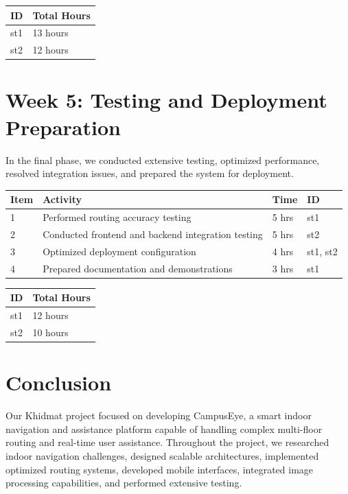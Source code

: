\documentclass{article}
\begin{document}
\bigskip

\begin{tabular}{|l|l|}
  \hline
  ID & Total Hours \\\hline\hline
  st1 & 13 hours \\\hline
  st2 & 12 hours \\\hline
\end{tabular}

\newpage
\section*{Week 5: Testing and Deployment Preparation}

In the final phase, we conducted extensive testing, optimized performance, resolved integration issues, and prepared the system for deployment.

\begin{tabular}{|l|l|l|l|}
  \hline
  Item & Activity & Time & ID \\\hline\hline
  1 & Performed routing accuracy testing & 5 hrs & st1 \\\hline
  2 & Conducted frontend and backend integration testing & 5 hrs & st2 \\\hline
  3 & Optimized deployment configuration & 4 hrs & st1, st2 \\\hline
  4 & Prepared documentation and demonstrations & 3 hrs & st1 \\\hline
\end{tabular}

\bigskip

\begin{tabular}{|l|l|}
  \hline
  ID & Total Hours \\\hline\hline
  st1 & 12 hours \\\hline
  st2 & 10 hours \\\hline
\end{tabular}

\newpage
\section*{Conclusion}

Our Khidmat project focused on developing CampusEye, a smart indoor navigation and assistance platform capable of handling complex multi-floor routing and real-time user assistance. Throughout the project, we researched indoor navigation challenges, designed scalable architectures, implemented optimized routing systems, developed mobile interfaces, integrated image processing capabilities, and performed extensive testing.
\end{document}
